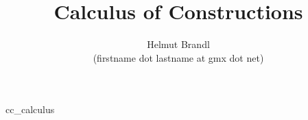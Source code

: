 \documentclass[12pt]{article}
\begin{document}


\title{Calculus of Constructions}
\author{Helmut Brandl \\ \scriptsize (firstname dot lastname at gmx dot net)}
\date{}

\maketitle

\abstract{
}


\tableofcontents

 {cc_calculus}




\end{document}
